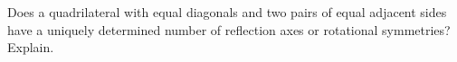 Does a quadrilateral with equal diagonals and two pairs of equal adjacent sides have a uniquely determined number of reflection axes or rotational symmetries? Explain.
